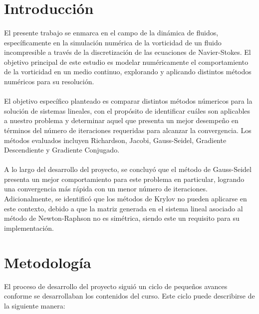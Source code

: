 \documentclass{article}
\begin{document}
  \section*{Introducción}
  \paragraph{}
  El presente trabajo se enmarca en el campo de la dinámica de fluidos, específicamente en la simulación numérica de la vorticidad de un fluido incompresible a través de la discretización de las ecuaciones de Navier-Stokes. El objetivo principal de este estudio es modelar numéricamente el comportamiento de la vorticidad en un medio continuo, explorando y aplicando distintos métodos numéricos para su resolución.

  \paragraph{}
  El objetivo específico planteado es comparar distintos métodos númericos para la solución de sistemas lineales, con el propósito de identificar cuáles son aplicables a nuestro problema y determinar aquel que presenta un mejor desempeño en términos del número de iteraciones requeridas para alcanzar la convergencia. Los métodos evaluados incluyen Richardson, Jacobi, Gauss-Seidel, Gradiente Descendiente y Gradiente Conjugado.
  
  \paragraph{}
  A lo largo del desarrollo del proyecto, se concluyó que el método de Gauss-Seidel presenta un mejor comportamiento para este problema en particular, logrando una convergencia más rápida con un menor número de iteraciones. Adicionalmente, se identificó que los métodos de Krylov no pueden aplicarse en este contexto, debido a que la matriz generada en el sistema lineal asociado al método de Newton-Raphson no es simétrica, siendo este un requisito para su implementación.

  \section*{Metodología}

  El proceso de desarrollo del proyecto siguió un ciclo de pequeños avances conforme se desarrollaban los contenidos del curso. Este ciclo puede describirse de la siguiente manera:
\end{document}

